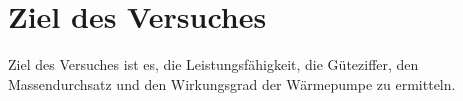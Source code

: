 \section{Ziel des Versuches}
\label{sec:Ziel des Versuches}
Ziel des Versuches ist es, die Leistungsfähigkeit, die Güteziffer, den Massendurchsatz und den Wirkungsgrad der Wärmepumpe zu ermitteln.
